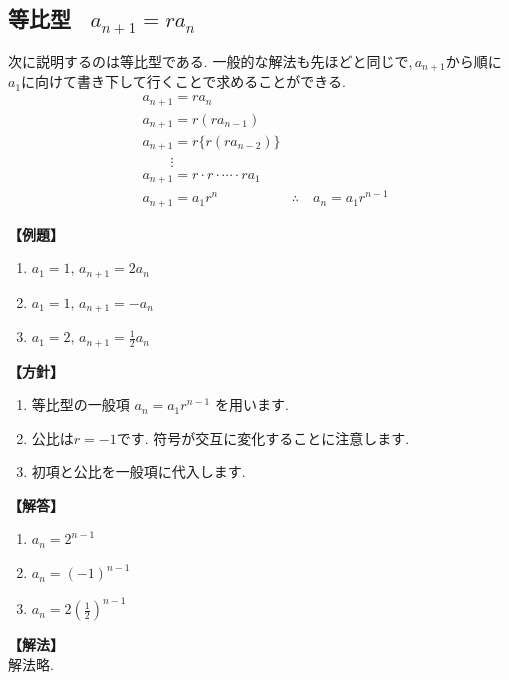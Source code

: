 
    \subsection{等比型 \, $a_{n+1}=ra_n$}
      次に説明するのは等比型である.
      一般的な解法も先ほどと同じで,\,$a_{n+1}$から順に$a_1$に向けて書き下して行くことで求めることができる.
      \begin{align*}
        &a_{n+1}=ra_n\\
        &a_{n+1}=r(ra_{n-1})\\
        &a_{n+1}=r\{r(ra_{n-2})\}\\
        &\qquad \vdots\\
        &a_{n+1}=r\cdot r \cdot \cdots \cdot ra_1\\
        &a_{n+1}=a_1r^n
        &\therefore \quad a_n=a_1r^{n-1}
      \end{align*}

      \noindent \textbf{【例題】}
      \begin{enumerate}[label=(\arabic*),parsep=3pt]
        \item $\displaystyle a_1=1,\, a_{n+1}=2a_n$
        \item $\displaystyle a_1=1,\, a_{n+1}=-a_n$
        \item $\displaystyle a_1=2,\, a_{n+1}=\frac{1}{2}a_n$
      \end{enumerate}

      \noindent\textbf{【方針】}
      \begin{enumerate}[label=(\arabic*),parsep=3pt]
        \item 等比型の一般項
              $\displaystyle a_n=a_1r^{n-1}$
              を用います.
        \item 公比は$r=-1$です.
              符号が交互に変化することに注意します.
        \item 初項と公比を一般項に代入します.
      \end{enumerate}

      \noindent\textbf{【解答】}
      \begin{enumerate}[label=(\arabic*),parsep=3pt]
        \item $\displaystyle a_n=2^{n-1}$
        \item $\displaystyle a_n=(-1)^{n-1}$
        \item $\displaystyle a_n=2\left(\frac12\right)^{n-1}$
      \end{enumerate}

      \noindent\textbf{【解法】}\\
      解法略.


